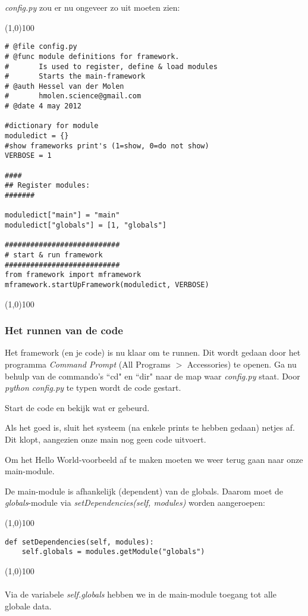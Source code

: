 \documentclass[a4paper]{article}
\begin{document}
\textit{config.py} zou er nu ongeveer zo uit moeten zien:

\noindent \line(1,0){100}
\begin{verbatim}
# @file config.py
# @func module definitions for framework. 
#       Is used to register, define & load modules 
#       Starts the main-framework
# @auth Hessel van der Molen
#       hmolen.science@gmail.com
# @date 4 may 2012

#dictionary for module
moduledict = {}
#show frameworks print's (1=show, 0=do not show)
VERBOSE = 1

####
## Register modules:
#######

moduledict["main"] = "main"
moduledict["globals"] = [1, "globals"]

###########################
# start & run framework
###########################
from framework import mframework
mframework.startUpFramework(moduledict, VERBOSE)
\end{verbatim}
\noindent \line(1,0){100}

\subsubsection{Het runnen van de code}
Het framework (en je code) is nu klaar om te runnen. Dit wordt gedaan door het programma \textit{Command Prompt} (All Programs $>$ Accessories) te openen. 
Ga nu behulp van de commando's ``cd"  en ``dir" naar de map waar \textit{config.py} staat.
Door \textit{python config.py} te typen wordt de code gestart.

Start de code en bekijk wat er gebeurd.

Als het goed is, sluit het systeem (na enkele prints te hebben gedaan) netjes af. Dit klopt, aangezien onze main nog geen code uitvoert.

Om het Hello World-voorbeeld af te maken moeten we weer terug gaan naar onze main-module.

De main-module is afhankelijk (dependent) van de globals. Daarom moet de \textit{globals}-module via \textit{setDependencies(self, modules)} worden aangeroepen:

\noindent \line(1,0){100}
\begin{verbatim}
def setDependencies(self, modules):
    self.globals = modules.getModule("globals")
\end{verbatim}
\noindent \line(1,0){100}
\\\\
Via de variabele \textit{self.globals} hebben we in de main-module toegang tot alle globale data.
\end{document}

